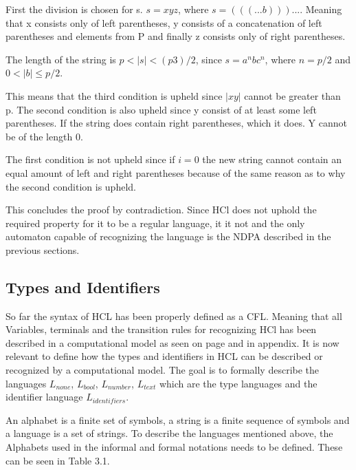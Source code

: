 First the division is chosen for s.
$s = xyz$, where $s = (((...b)))...$.
Meaning that x consists only of left parentheses, y consists of a concatenation of left parentheses and elements from P and finally z consists only of right parentheses.

The length of the string is $p < |s| < (p3)/2$, since $s = a^nbc^n$, where $n = p/2$ and $0 < |b| \leq p/2$.

This means that the third condition is upheld since $|xy|$ cannot be greater than p.
The second condition is also upheld since y consist of at least some left parentheses. If the string does contain right parentheses, which it does. Y cannot be of the length 0.

The first condition is not upheld since if $i = 0$ the new string cannot contain an equal amount of left and right parentheses because of the same reason as to why the second condition is upheld.

This concludes the proof by contradiction.
Since HCl does not uphold the required property for it to be a regular language, it it not and the only automaton capable of recognizing the language is the NDPA described in the previous sections.

\subsection{Types and Identifiers}
So far the syntax of HCL has been properly defined as a CFL. 
Meaning that all Variables, terminals and the transition rules for recognizing HCl has been described in a computational model as seen on page 
and in appendix.
It is now relevant to define how the types and identifiers in HCL can be described or recognized by a computational model.
The goal is to formally describe the languages $L_{none}$, $L_{bool}$, $L_{number}$, $L_{text}$ which are the type languages and the identifier language $L_{identifiers}$.

An alphabet is a finite set of symbols, a string is a finite sequence of symbols and a language is a set of strings.
To describe the languages mentioned above, the Alphabets used in the informal and formal notations needs to be defined. These can be seen in Table 3.1.

